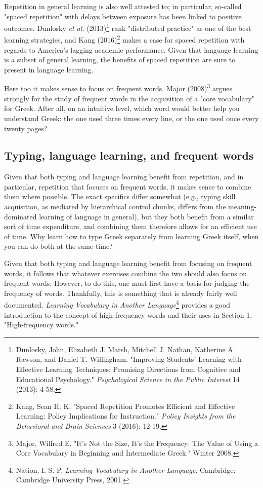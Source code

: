 \documentclass[11pt]{article}
\begin{document}
Repetition in general learning is also well attested to; in particular, so-called "spaced repetition" with delays between exposure has been linked to positive outcomes. Dunlosky \emph{et al.} (2013)\footnote{Dunlosky, John, Elizabeth J. Marsh, Mitchell J. Nathan, Katherine A. Rawson, and Daniel T. Willingham. "Improving Students' Learning with Effective Learning Techniques: Promising Directions from Cognitive and Educational Psychology." \emph{Psychological Science in the Public Interest} 14 (2013): 4-58.} rank "distributed practice" as one of the best learning strategies, and Kang (2016)\footnote{Kang, Sean H. K. "Spaced Repetition Promotes Efficient and Effective Learning: Policy Implications for Instruction." \emph{Policy Insights from the Behavioral and Brain Sciences} 3 (2016): 12-19.} makes a case for spaced repetition with regards to America's lagging academic performance. Given that language learning is a subset of general learning, the benefits of spaced repetition are sure to present in language learning.

Here too it makes sense to focus on frequent words. Major (2008)\footnote{Major, Wilfred E. "It’s Not the Size, It’s the Frequency: The Value of Using a Core Vocabulary in Beginning and Intermediate Greek." Winter 2008.} argues strongly for the study of frequent words in the acquisition of a "core vocabulary" for Greek. After all, on an intuitive level, which word would better help you understand Greek: the one used three times every line, or the one used once every twenty pages?

\subsection{Typing, language learning, and frequent words}
\label{sec:orgb5aadcf}

Given that both typing and language learning benefit from repetition, and in particular, repetition that focuses on frequent words, it makes sense to combine them where possible. The exact specifics differ somewhat (e.g., typing skill acquisition, as mediated by hierarchical control chunks, differs from the meaning-dominated learning of language in general), but they both benefit from a similar sort of time expenditure, and combining them therefore allows for an efficient use of time. Why learn how to type Greek separately from learning Greek itself, when you can do both at the same time?

Given that both typing and language learning benefit from focusing on frequent words, it follows that whatever exercises combine the two should also focus on frequent words. However, to do this, one must first have a basis for judging the frequency of words. Thankfully, this is something that is already fairly well documented. \emph{Learning Vocabulary in Another Language}\footnote{Nation, I. S. P. \emph{Learning Vocabulary in Another Language}. Cambridge: Cambridge University Press, 2001.} provides a good introduction to the concept of high-frequency words and their uses in Section 1, "High-frequency words." 
\end{document}

